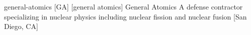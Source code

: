 \newglsXcompany%
{general-atomics}%
[GA]%
[general atomics]%
{General Atomics}%
{A defense contractor specializing in nuclear physics including nuclear fission and nuclear fusion \cite{website:General_Atomics}}%
[San Diego, CA]%